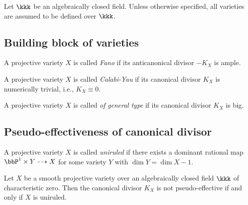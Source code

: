 Let \(\kkk\) be an algebraically closed field.
Unless otherwise specified, all varieties are assumed to be defined over \(\kkk\).

\subsection{Building block of varieties}

    \begin{definition}\label{def:Fano_variety}
        A projective variety \(X\) is called \emph{Fano} if its anticanonical divisor \(-K_X\) is ample.
    \end{definition}

    \begin{definition}\label{def:Calabi_Yau_variety}
        A projective variety \(X\) is called \emph{Calabi-Yau} if its canonical divisor \(K_X\) is numerically trivial, i.e., \(K_X\equiv 0\).
    \end{definition}

    \begin{definition}\label{def:variety_of_general_type}
        A projective variety \(X\) is called \emph{of general type} if its canonical divisor \(K_X\) is big.
    \end{definition}

\subsection{Pseudo-effectiveness of canonical divisor}

    \begin{definition}\label{def:uniruled_variety}
        A projective variety \(X\) is called \emph{uniruled} if there exists a dominant rational map \(\bbP^1\times Y\dashrightarrow X\) for some variety \(Y\) with \(\dim Y=\dim X-1\).
    \end{definition}

    \begin{theorem}\label{thm:K_X_not_pseudo_effective_iff_uniruled}
        Let \(X\) be a smooth projective variety over an algebraically closed field \(\kkk\) of characteristic zero.
        Then the canonical divisor \(K_X\) is not pseudo-effective if and only if \(X\) is uniruled.
    \end{theorem}
